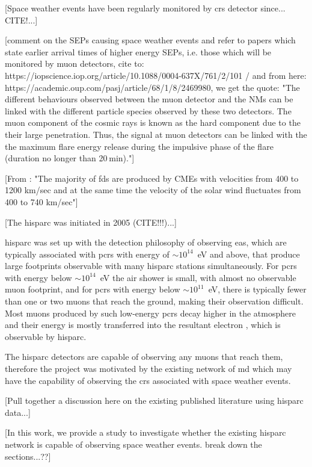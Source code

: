 [Space weather events have been regularly monitored by \glspl{cr} detector since... CITE!...]

[comment on the SEPs causing space weather events and refer to papers which state earlier arrival times of higher energy SEPs, i.e. those which will be monitored by muon detectors, cite to: https://iopscience.iop.org/article/10.1088/0004-637X/761/2/101 / and from here: https://academic.oup.com/pasj/article/68/1/8/2469980, we get the quote: "The different behaviours observed between the muon detector and the NMs can be linked with the different particle species observed by these two detectors. The muon component of the cosmic rays is known as the hard component due to the their large penetration. Thus, the signal at muon detectors can be linked with the the maximum flare energy release during the impulsive phase of the flare (duration no longer than 20 min)."]

[From \citet{lingri_forbush_2016}: "The majority of \glspl{fd} are produced by CMEs with velocities from 400 to 1200 km/sec and at the same time the velocity of the solar wind fluctuates from 400 to 740 km/sec"]

[The \gls{hisparc} was initiated in 2005 (CITE!!!)...]

\gls{hisparc} was set up with the detection philosophy of observing \gls{eas}, which are typically associated with \glspl{pcr} with energy of $\sim10^{14}$~eV and above, that produce large footprints observable with many \gls{hisparc} stations simultaneously. For \glspl{pcr} with energy below $\sim10^{14}$~eV the air shower is small, with almost no observable muon footprint, and for \glspl{pcr} with energy below $\sim10^{11}$~eV, there is typically fewer than one or two muons that reach the ground, making their observation difficult. Most muons produced by such low-energy \glspl{pcr} decay higher in the atmosphere and their energy is mostly transferred into the resultant electron \citep{van_dam_hisparc_2020}, which is observable by \gls{hisparc}.

The \gls{hisparc} detectors are capable of observing any muons that reach them, therefore the project was motivated by the existing network of \gls{md} which may have the capability of observing the \glspl{cr} associated with space weather events.

[Pull together a discussion here on the existing published literature using hisparc data...]

[In this work, we provide a study to investigate whether the existing \gls{hisparc} network is capable of observing space weather events. break down the sections...??]


